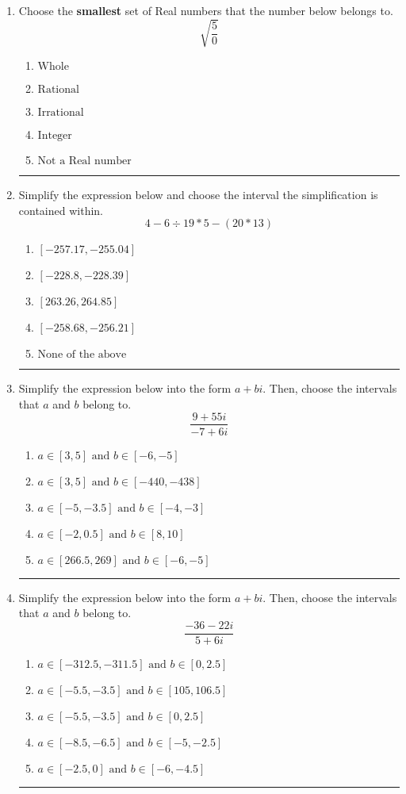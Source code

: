 \documentclass[14pt]{extbook}
\newcommand{\litem}[1]{\item#1\hspace*{-1cm}\rule{\textwidth}{0.4pt}}
\begin{document}
\begin{enumerate}
{\begin{enumerate}[label=\Alph*.]
\end{enumerate} }
\litem{
Choose the \textbf{smallest} set of Real numbers that the number below belongs to.\[ \sqrt{\frac{5}{0}} \]\begin{enumerate}[label=\Alph*.]
\item \( \text{Whole} \)
\item \( \text{Rational} \)
\item \( \text{Irrational} \)
\item \( \text{Integer} \)
\item \( \text{Not a Real number} \)

\end{enumerate} }
\litem{
Simplify the expression below and choose the interval the simplification is contained within.\[ 4 - 6 \div 19 * 5 - (20 * 13) \]\begin{enumerate}[label=\Alph*.]
\item \( [-257.17, -255.04] \)
\item \( [-228.8, -228.39] \)
\item \( [263.26, 264.85] \)
\item \( [-258.68, -256.21] \)
\item \( \text{None of the above} \)

\end{enumerate} }
\litem{
Simplify the expression below into the form $a+bi$. Then, choose the intervals that $a$ and $b$ belong to.\[ \frac{9 + 55 i}{-7 + 6 i} \]\begin{enumerate}[label=\Alph*.]
\item \( a \in [3, 5] \text{ and } b \in [-6, -5] \)
\item \( a \in [3, 5] \text{ and } b \in [-440, -438] \)
\item \( a \in [-5, -3.5] \text{ and } b \in [-4, -3] \)
\item \( a \in [-2, 0.5] \text{ and } b \in [8, 10] \)
\item \( a \in [266.5, 269] \text{ and } b \in [-6, -5] \)

\end{enumerate} }
\litem{
Simplify the expression below into the form $a+bi$. Then, choose the intervals that $a$ and $b$ belong to.\[ \frac{-36 - 22 i}{5 + 6 i} \]\begin{enumerate}[label=\Alph*.]
\item \( a \in [-312.5, -311.5] \text{ and } b \in [0, 2.5] \)
\item \( a \in [-5.5, -3.5] \text{ and } b \in [105, 106.5] \)
\item \( a \in [-5.5, -3.5] \text{ and } b \in [0, 2.5] \)
\item \( a \in [-8.5, -6.5] \text{ and } b \in [-5, -2.5] \)
\item \( a \in [-2.5, 0] \text{ and } b \in [-6, -4.5] \)


\end{enumerate}}
\end{enumerate}
\end{document}
